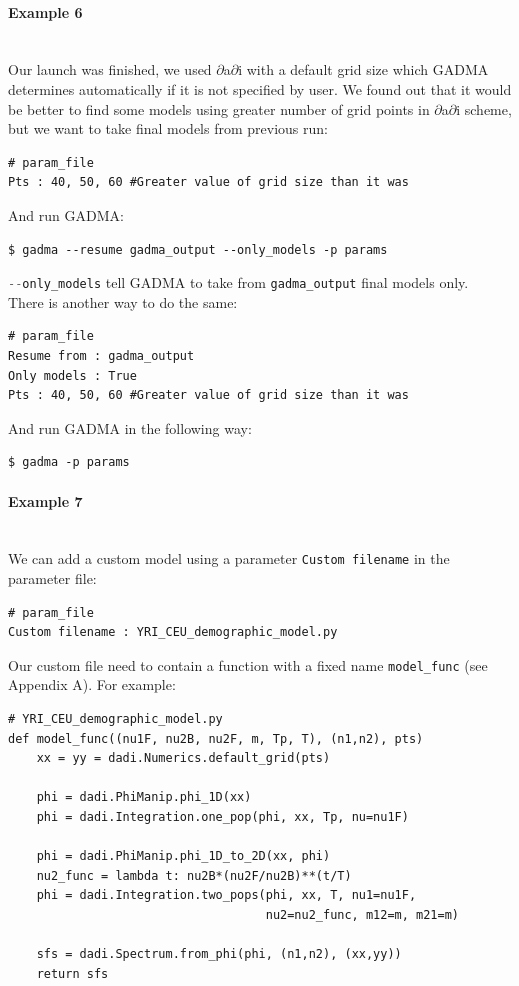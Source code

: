 \documentclass[12pt]{article}
\makeatletter
\newcommand{\dadi}{$\partial$a$\partial$i\xspace}
\newcommand{\py}[1]{\lstinline[language=Python, showstringspaces=False]@#1@}
\makeatother
\begin{document}
\paragraph{Example 6}\mbox{}\\
Our launch was finished, we used \dadi with a default grid size which GADMA determines automatically if it is not specified by user. We found out that it would be better to find some models using greater number of grid points in \dadi scheme, but we want to take final models from previous run:

\begin{lstlisting}
# param_file
Pts : 40, 50, 60 #Greater value of grid size than it was
\end{lstlisting}

And run GADMA:
\begin{lstlisting}
$ gadma --resume gadma_output --only_models -p params 
\end{lstlisting}

\py{--only_models} tell GADMA to take from \py{gadma_output} final models only. \\

There is another way to do the same:
\begin{lstlisting}
# param_file
Resume from : gadma_output
Only models : True
Pts : 40, 50, 60 #Greater value of grid size than it was
\end{lstlisting}

And run GADMA in the following way:
\begin{lstlisting}
$ gadma -p params
\end{lstlisting}

\paragraph{Example 7}\mbox{}\\
We can add a custom model using a parameter \py{Custom filename} in the parameter file:

\begin{lstlisting}
# param_file
Custom filename : YRI_CEU_demographic_model.py
\end{lstlisting}

Our custom file need to contain a function with a fixed name \py{model_func} (see Appendix A). For example:

\begin{lstlisting}
# YRI_CEU_demographic_model.py
def model_func((nu1F, nu2B, nu2F, m, Tp, T), (n1,n2), pts)
    xx = yy = dadi.Numerics.default_grid(pts)

    phi = dadi.PhiManip.phi_1D(xx)
    phi = dadi.Integration.one_pop(phi, xx, Tp, nu=nu1F)

    phi = dadi.PhiManip.phi_1D_to_2D(xx, phi)
    nu2_func = lambda t: nu2B*(nu2F/nu2B)**(t/T)
    phi = dadi.Integration.two_pops(phi, xx, T, nu1=nu1F, 
                                    nu2=nu2_func, m12=m, m21=m)

    sfs = dadi.Spectrum.from_phi(phi, (n1,n2), (xx,yy))
    return sfs
\end{lstlisting}
\end{document}
